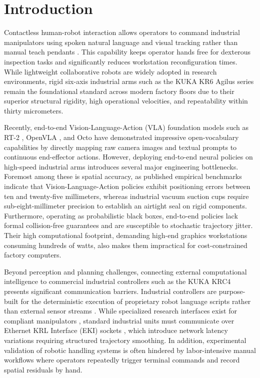 \documentclass{svproc}
\begin{document}
\section{Introduction}
\label{sec:introduction}

Contactless human-robot interaction allows operators to command industrial manipulators using spoken natural language and visual tracking rather than manual teach pendants \cite{cherubini2016}. This capability keeps operator hands free for dexterous inspection tasks and significantly reduces workstation reconfiguration times. While lightweight collaborative robots are widely adopted in research environments, rigid six-axis industrial arms such as the KUKA KR6 Agilus series remain the foundational standard across modern factory floors due to their superior structural rigidity, high operational velocities, and repeatability within thirty micrometers.

Recently, end-to-end Vision-Language-Action (VLA) foundation models such as RT-2 \cite{rt2_2023}, OpenVLA \cite{openvla2024}, and Octo \cite{octo2024} have demonstrated impressive open-vocabulary capabilities by directly mapping raw camera images and textual prompts to continuous end-effector actions. However, deploying end-to-end neural policies on high-speed industrial arms introduces several major engineering bottlenecks. Foremost among these is spatial accuracy, as published empirical benchmarks indicate that Vision-Language-Action policies exhibit positioning errors between ten and twenty-five millimeters, whereas industrial vacuum suction cups require sub-eight-millimeter precision to establish an airtight seal on rigid components. Furthermore, operating as probabilistic black boxes, end-to-end policies lack formal collision-free guarantees and are susceptible to stochastic trajectory jitter. Their high computational footprint, demanding high-end graphics workstations consuming hundreds of watts, also makes them impractical for cost-constrained factory computers.

Beyond perception and planning challenges, connecting external computational intelligence to commercial industrial controllers such as the KUKA KRC4 \cite{kuka_kss2018} presents significant communication barriers. Industrial controllers are purpose-built for the deterministic execution of proprietary robot language scripts rather than external sensor streams \cite{jopenshowvar2015,kuka_external_control2023}. While specialized research interfaces exist for compliant manipulators \cite{lbr_stack2024}, standard industrial units must communicate over Ethernet KRL Interface (EKI) sockets \cite{kuka_external_control2023}, which introduce network latency variations requiring structured trajectory smoothing. In addition, experimental validation of robotic handling systems is often hindered by labor-intensive manual workflows where operators repeatedly trigger terminal commands and record spatial residuals by hand.
\end{document}
